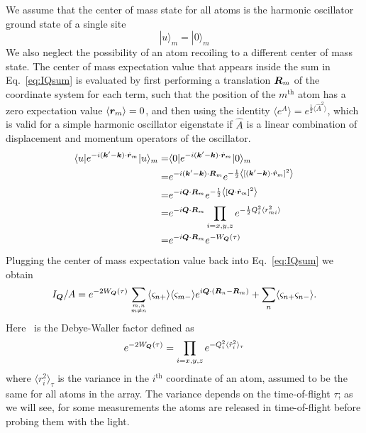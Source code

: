 We assume that the center of mass state for all atoms is the harmonic
oscillator ground state of a single site
\begin{equation} 
   |u\rangle_{m}  = |0\rangle_{m}
\end{equation}
We also neglect the possibility of an atom recoiling to a different center of
mass state. The center of mass expectation value that appears inside the sum in
Eq.~\ref{eq:IQsum} is evaluated by first performing a translation $\bm{R}_{m}$
of the coordinate system for each term, such that the position of the
$m^{\text{th}}$ atom has a zero expectation value $\langle \bm{r}_{m}
\rangle=0$,  and then using the identity $\langle e^{\hat{A}} \rangle =
e^{\frac{1}{2} \langle \hat{A}^{2} \rangle}$, which is valid for a simple
harmonic oscillator eigenstate if $\hat{A}$ is a linear combination of
displacement and momentum operators of the oscillator.  
\begin{equation}
\begin{split}
      \langle u | e^{-i(\bm{k}'-\bm{k}) \cdot\hat{\bm{r}}_{m}} | u  \rangle_{m} = & 
      \langle 0 | e^{-i(\bm{k}'-\bm{k}) \cdot\hat{\bm{r}}_{m}} | 0  \rangle_{m} \\
    = & e^{-i(\bm{k}'-\bm{k}) \cdot\bm{R}_{m}} 
      e^{ -\frac{1}{2} \left\langle 
          [ (\bm{k}'-\bm{k}) \cdot\hat{\bm{r}}_{m} ]^{2} \right\rangle } \\
    = & e^{ -i \bm{Q} \cdot \bm{R}_{m}} 
      e^{ -\frac{1}{2} \left\langle [ \bm{Q} \cdot\hat{\bm{r}}_{m} ]^{2} \right\rangle } \\ 
    = & e^{ -i \bm{Q} \cdot \bm{R}_{m}}
      \prod_{i=x,y,z} e^{ - \frac{1}{2}Q_{i}^{2}\langle r_{mi} ^{2} \rangle } \\ 
    = & e^{ -i \bm{Q} \cdot \bm{R}_{m}}
      e^{-W_{\bm{Q}}(\tau)} 
\end{split}
\end{equation} 
Plugging the center of mass expectation value back into Eq.~\ref{eq:IQsum} we
obtain 
\begin{equation}
 I_{\bv{Q}} / A     =
  \debyew
    \sumOff \langle \varsigma_{n+}\rangle \langle \varsigma_{m-} \rangle
  e^{ i \bv{Q} \cdot ( \bv{R}_{n} - \bv{R}_{m} ) }
   + \sum_{n}  \langle \varsigma_{n+} \varsigma_{n-} \rangle.
 \label{eq:IQresult}
\end{equation}
Here \debyew\ is the Debye-Waller factor defined as
\begin{equation}
  e^{-2W_{\bm{Q}}(\tau)}  = \prod_{i=x,y,z} e^{-Q_{i}^{2} 
              \langle \hat{r}_{i}^{2} \rangle_{\tau} }
\label{eq:define-debyew}
\end{equation}
where $\langle r_{i}^{2} \rangle_{\tau}$ is the variance in the $i^{\text{th}}$
coordinate of an atom, assumed to be the same for all atoms in the array.   The
variance depends on the time-of-flight $\tau$;  as we will see, for some
measurements the atoms are released in time-of-flight before probing them with
the light. 

